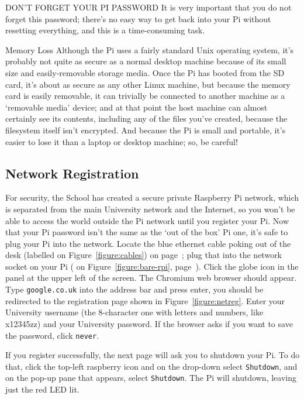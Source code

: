 \begin{danger}{DON'T FORGET YOUR PI PASSWORD}
It is very important that you do not forget this password; there's no easy way to get back into your Pi without resetting everything, and this is a time-consuming task.
\end{danger}

\begin{danger}{Memory Loss}
Although the Pi uses a fairly standard Unix operating system, it's probably not quite as secure as a normal desktop machine because of its small size and easily-removable storage media. Once the Pi has booted from the SD card, it's about as secure as any other Linux machine, but because the memory card is easily removable, it can trivially be connected to another machine as a `removable media' device; and at that point the host machine can almost certainly see its contents, including any of the files you've created, because the filesystem itself isn't encrypted. And because the Pi is small and portable, it's easier to lose it than a laptop or desktop machine; so, be careful!
\end{danger}

\subsection{Network Registration}
\label{sec:netreg}

For security, the School has created a secure private Raspberry Pi
network, which is separated from the main University network and the
Internet, so you won't be able to access the world outside the Pi
network until you register your Pi. Now that your Pi password isn't
the same as the `out of the box' Pi one, it's safe to plug your Pi
into the network. Locate the blue ethernet cable poking out of the
desk (labelled \protect{} on Figure~\ref{figure:cables}) on
page~\pageref{figure:cables}; plug that into the network socket on
your Pi ( on Figure~\ref{figure:bare-rpi},
page~\pageref{figure:bare-rpi}). Click the globe icon in the panel at
the upper left of the screen. The Chromium web browser should
appear. Type \verb+google.co.uk+ into the address bar and press enter,
you should be redirected to the registration page shown in
Figure~\ref{figure:netreg}. 
\cbstart Enter your University username (the
8-character one with letters and numbers, like x12345zz) and your
University password. 
\cbend 
If the browser asks if you want to save the
password, click \verb+never+.

If you register successfully, the next page will ask you to shutdown
your Pi. To do that, click the top-left raspberry icon and on the
drop-down select \verb+Shutdown+, and on the pop-up pane that appears, select \verb+Shutdown+.
The Pi will shutdown, leaving just the red LED lit.

